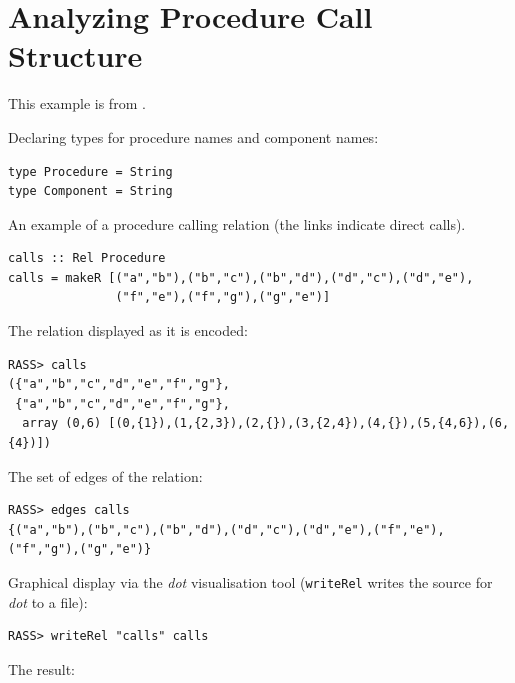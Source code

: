 \documentclass[11pt]{article}
\newlength{\fminilength}
\newenvironment{fminipage}[1][\linewidth]
 {\setlength{\fminilength}{#1-2\fboxsep-2\fboxrule-1em}%
  \bigskip\begin{lrbox}{\fminibox}\quad\begin{minipage}{\fminilength}\bigskip}
 {\smallskip\end{minipage}\end{lrbox}\noindent\fbox{\usebox{\fminibox}}\bigskip}
\newcommand{\bc}{\begin{fminipage}}
\newcommand{\ec}{\end{fminipage}}
\begin{document}

\section{Analyzing Procedure Call Structure}

This example is from \cite{Klint03:atitr}. 

Declaring types for procedure names and component names:

\bc\begin{verbatim} 
type Procedure = String
type Component = String 
\end{verbatim}\ec

An example of a procedure calling relation (the links indicate 
direct calls). 

\bc\begin{verbatim}
calls :: Rel Procedure
calls = makeR [("a","b"),("b","c"),("b","d"),("d","c"),("d","e"),
               ("f","e"),("f","g"),("g","e")]
\end{verbatim}\ec

The relation displayed as it is encoded: 

\begin{verbatim}
RASS> calls
({"a","b","c","d","e","f","g"},
 {"a","b","c","d","e","f","g"},
  array (0,6) [(0,{1}),(1,{2,3}),(2,{}),(3,{2,4}),(4,{}),(5,{4,6}),(6,{4})])
\end{verbatim}

The set of edges of the relation: 

\begin{verbatim}
RASS> edges calls
{("a","b"),("b","c"),("b","d"),("d","c"),("d","e"),("f","e"),("f","g"),("g","e")}
\end{verbatim}

Graphical display via the {\em dot} \cite{KouNor:dgwd}
visualisation tool (\verb^writeRel^ writes the source for  {\em dot}
to a file): 

\begin{verbatim}
RASS> writeRel "calls" calls
\end{verbatim} 

The result: 
\end{document}
